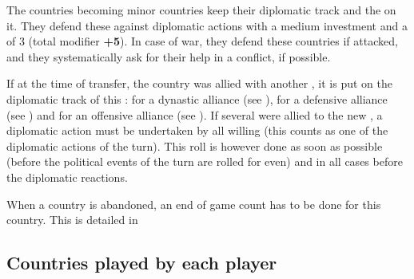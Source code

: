 \label{chSpecific:Campaign:Minor
  Diplomatic Track}
The countries becoming minor countries keep their diplomatic track and the
\MIN on it. They defend these against diplomatic actions with a medium
investment and a \DIP of 3 (total modifier {\bf +5}).
\bparag In case of war, they defend these countries if attacked, and they
systematically ask for their help in a conflict, if possible.

 If at the time of
transfer, the country was allied with another \MAJ, it is put on the
diplomatic track of this \MAJ: \RM for a dynastic alliance (see
), \SUB for a defensive alliance
(see ) and \MA for an offensive
alliance (see ).
\bparag If several \MAJ were allied to the new \MIN, a diplomatic action must
be undertaken by all willing \MAJ (this counts as one of the diplomatic
actions of the turn). This roll is however done as soon as possible (before
the political events of the turn are rolled for even) and in all cases before
the diplomatic reactions.

\aparag[\VP summary] When a country is abandoned, an end of game \VP count has
to be done for this country. This is detailed in 


\subsection{Countries played by each player}
